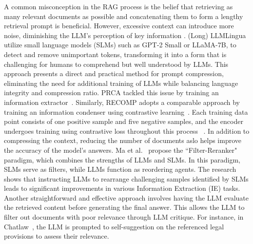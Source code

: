 A common misconception in the RAG process is the belief that retrieving as many relevant documents as possible and concatenating them to form a lengthy retrieval prompt is beneficial. However, excessive context can introduce more noise, diminishing the LLM’s perception of key information .
(Long) LLMLingua~ utilize small language models (SLMs) such as GPT-2 Small or LLaMA-7B, to detect and remove  unimportant tokens, transforming it into a form that is challenging for humans to comprehend but well understood by LLMs. This approach presents a direct and practical method for prompt compression, eliminating the need for additional training of LLMs while balancing language integrity and compression ratio. PRCA tackled this issue by training an information extractor~. Similarly, RECOMP adopts a comparable approach by training an information condenser using contrastive learning~. Each training data point consists of one positive sample and five negative samples, and the encoder undergoes training using contrastive loss throughout this process~ .
In addition to compressing the context,  reducing the number of documents aslo helps improve the accuracy of the model's answers. Ma et al.~ propose the ``Filter-Reranker" paradigm, which combines the strengths of LLMs and SLMs. In this paradigm, SLMs serve as filters, while LLMs function as reordering agents. The research shows that instructing LLMs to rearrange challenging samples identified by SLMs leads to significant improvements in various Information Extraction (IE) tasks. Another straightforward and effective approach involves having the LLM evaluate the retrieved content before generating the final answer. This allows the LLM to filter out documents with poor relevance through LLM critique. For instance, in Chatlaw~, the LLM is prompted to self-suggestion on the referenced legal provisions to assess their relevance.

